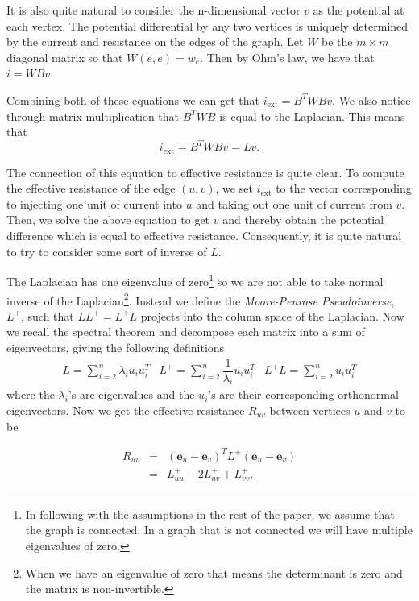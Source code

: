 \documentclass[12pt,twoside]{article}
\newcommand{\mbf}{\mathbf}
\begin{document}
It is also quite natural to consider the n-dimensional vector $v$ as the potential at each vertex. The potential differential by any two vertices is uniquely determined by the current and resistance on the edges of the graph. Let $W$ be the $m \times m$ diagonal matrix so that $W(e,e) = w_e$. Then by Ohm's law, we have that $i = WBv$. 

Combining both of these equations we can get that $i_{\text{ext}} = B^TWBv$. We also notice through matrix multiplication that $B^TWB$ is equal to the Laplacian. This means that
%
\begin{equation*}
i_{\text{ext}} = B^TWBv = Lv.
\end{equation*}

The connection of this equation to effective resistance is quite clear. To compute the effective resistance of the edge $(u,v)$, we set $i_{\text{ext}}$ to the vector corresponding to injecting one unit of current into $u$ and taking out one unit of current from $v$. Then, we solve the above equation to get $v$ and thereby obtain the potential difference which is equal to effective resistance. Consequently, it is quite natural to try to consider some sort of inverse of $L$. 

The Laplacian has one eigenvalue of zero\footnote{In following with the assumptions in the rest of the paper, we assume that the graph is connected. In a graph that is not connected we will have multiple eigenvalues of zero.} so we are not able to take normal inverse of the Laplacian\footnote{When we have an eigenvalue of zero that means the determinant is zero and the matrix is non-invertible.}. Instead we define the \textit{Moore-Penrose Pseudoinverse}, $L^+$, such that $LL^+ = L^+L$ projects into the column space of the Laplacian. Now we recall the spectral theorem and decompose each matrix into a sum of eigenvectors, giving the following definitions
%
\begin{eqnarray}
L = \sum\limits_{i=2}^{n} \lambda_i u_i u_i^T & L^+ = \sum\limits_{i=2}^{n} \dfrac{1}{\lambda_i} u_i u_i^T & L^+L = \sum\limits_{i=2}^{n} u_i u_i^T
\end{eqnarray}
%
where the $\lambda_i$'s are eigenvalues and the $u_i$'s are their corresponding orthonormal eigenvectors. Now we get the effective resistance $R_{uv}$ between vertices $u$ and $v$ to be 

\begin{eqnarray}
R_{uv} &=& (\mbf{e}_u - \mbf{e}_v)^T L^+ (\mbf{e}_u - \mbf{e}_v) \\
       &=&  L^+_{uu} -2L^+_{uv} + L^+_{vv}. 
\end{eqnarray}
\end{document}
